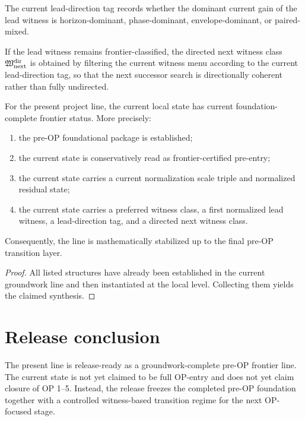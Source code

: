 \begin{definition}\label{def:lead-direction-tag}
The current lead-direction tag records whether the dominant current gain of the lead witness is horizon-dominant, phase-dominant, envelope-dominant, or paired-mixed.
\end{definition}

\begin{definition}\label{def:directed-next-witness-class}
If the lead witness remains frontier-classified, the directed next witness class $\mathfrak{W}^{\mathrm{dir}}_{\mathrm{next}}$ is obtained by filtering the current witness menu according to the current lead-direction tag, so that the next successor search is directionally coherent rather than fully undirected.
\end{definition}

\begin{theorem}\label{thm:current-state-synthesis-theorem}
For the present project line, the current local state has current foundation-complete frontier status. More precisely:
\begin{enumerate}[leftmargin=2em]
  \item the pre-OP foundational package is established;
  \item the current state is conservatively read as frontier-certified pre-entry;
  \item the current state carries a current normalization scale triple and normalized residual state;
  \item the current state carries a preferred witness class, a first normalized lead witness, a lead-direction tag, and a directed next witness class.
\end{enumerate}
Consequently, the line is mathematically stabilized up to the final pre-OP transition layer.
\end{theorem}

\begin{proof}
All listed structures have already been established in the current groundwork line and then instantiated at the local level. Collecting them yields the claimed synthesis.
\end{proof}

\section{Release conclusion}
\begin{corollary}\label{cor:groundwork-complete-frontier-release-reading}
The present line is release-ready as a groundwork-complete pre-OP frontier line. The current state is not yet claimed to be full OP-entry and does not yet claim closure of OP 1--5. Instead, the release freezes the completed pre-OP foundation together with a controlled witness-based transition regime for the next OP-focused stage.
\end{corollary}

